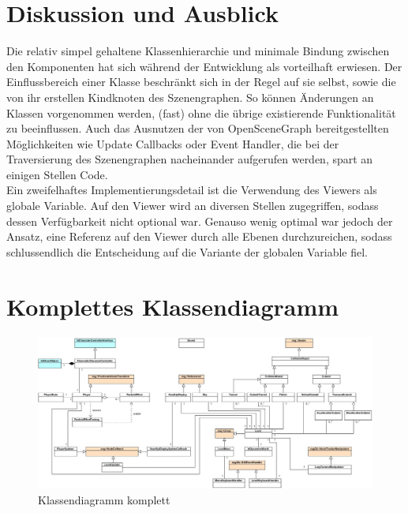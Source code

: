 \documentclass{llncs}
\begin{document}
\section{Diskussion und Ausblick}
Die relativ simpel gehaltene Klassenhierarchie und minimale Bindung zwischen den Komponenten hat sich w\"ahrend der Entwicklung als
vorteilhaft erwiesen. Der Einflussbereich einer Klasse beschr\"ankt sich in der Regel auf sie selbst, sowie die von ihr erstellen
Kindknoten des Szenengraphen. So k\"onnen \"Anderungen an Klassen vorgenommen werden, (fast) ohne die \"ubrige existierende Funktionalit\"at
zu beeinflussen. Auch das Ausnutzen der von OpenSceneGraph bereitgestellten M\"oglichkeiten wie Update Callbacks oder Event Handler, die
bei der Traversierung des Szenengraphen nacheinander aufgerufen werden, spart an einigen Stellen Code.\\
Ein zweifelhaftes Implementierungsdetail ist die Verwendung des Viewers als globale Variable. Auf den Viewer wird an diversen Stellen
zugegriffen, sodass dessen Verf\"ugbarkeit nicht optional war. Genauso wenig optimal war jedoch der Ansatz, eine Referenz auf den
Viewer durch alle Ebenen durchzureichen, sodass schlussendlich die Entscheidung auf die Variante der globalen Variable fiel.

\newpage

\appendix

\section{Komplettes Klassendiagramm}

\begin{figure}[ht]
	\centering
	\includegraphics[width=1.6\textwidth, angle=-90]{All.jpg}
	\caption{Klassendiagramm komplett}
\end{figure}
\end{document}
